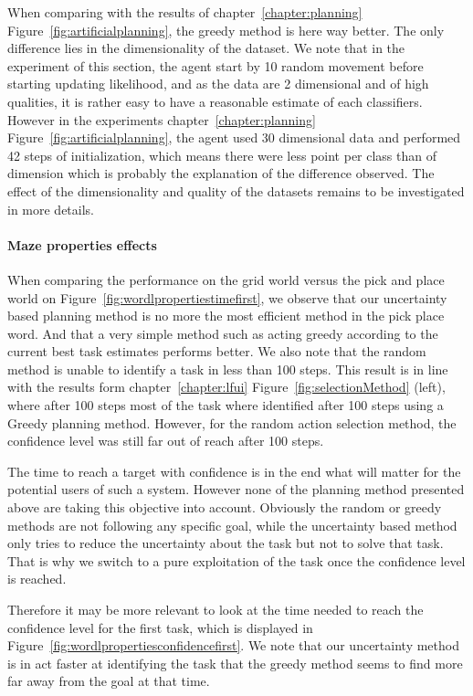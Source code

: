 When comparing with the results of chapter~\ref{chapter:planning} Figure~\ref{fig:artificialplanning}, the greedy method is here way better. The only difference lies in the dimensionality of the dataset. We note that in the experiment of this section, the agent start by 10 random movement before starting updating likelihood, and as the data are 2 dimensional and of high qualities, it is rather easy to have a reasonable estimate of each classifiers. However in the experiments  chapter~\ref{chapter:planning} Figure~\ref{fig:artificialplanning}, the agent used 30 dimensional data and performed 42 steps of initialization, which means there were less point per class than of dimension which is probably the explanation of the difference observed. The effect of the dimensionality and quality of the datasets remains to be investigated in more details.

\paragraph{Maze properties effects}

When comparing the performance on the grid world versus the pick and place world on Figure~\ref{fig:wordlpropertiestimefirst}, we observe that our uncertainty based planning method is no more the most efficient method in the pick place word. And that a very simple method such as acting greedy according to the current best task estimates performs better. We also note that the random method is unable to identify a task in less than 100 steps. This result is in line with the results form chapter~\ref{chapter:lfui} Figure~\ref{fig:selectionMethod} (left), where after 100 steps most of the task where identified after 100 steps using a Greedy planning method. However, for the random action selection method, the confidence level was still far out of reach after 100 steps.

The time to reach a target with confidence is in the end what will matter for the potential users of such a system. However none of the planning method presented above are taking this objective into account. Obviously the random or greedy methods are not following any specific goal, while the uncertainty based method only tries to reduce the uncertainty about the task but not to solve that task. That is why we switch to a pure exploitation of the task once the confidence level is reached.

Therefore it may be more relevant to look at the time needed to reach the confidence level for the first task, which is displayed in Figure~\ref{fig:wordlpropertiesconfidencefirst}. We note that our uncertainty method is in act faster at identifying the task that the greedy method seems to find more far away from the goal at that time.

